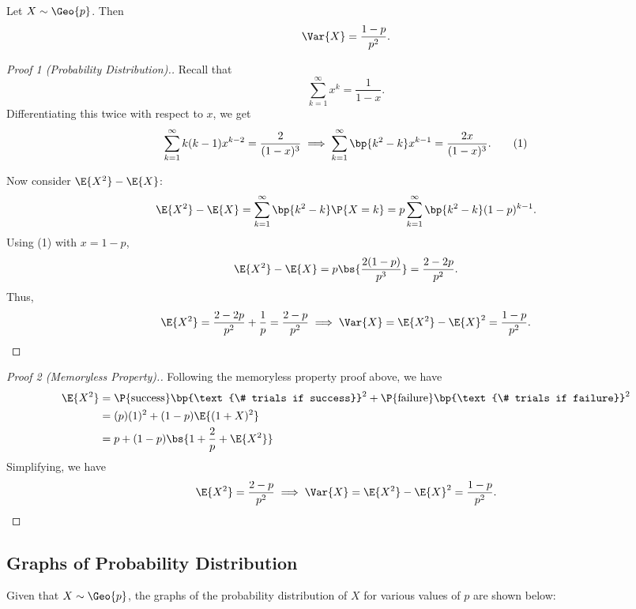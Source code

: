 \begin{proposition}
    Let $X \sim \Geo{p}$. Then \[\Var{X} = \frac{1-p}{p^2}.\]
\end{proposition}
\begin{proof}[Proof 1 (Probability Distribution).]
    Recall that \[\sum_{k = 1}^\infty x^k = \frac{1}{1 - x}.\] Differentiating this twice with respect to $x$, we get \[\sum_{k = 1}^\infty k(k-1) x^{k-2} = \frac{2}{(1-x)^3} \implies \sum_{k = 1}^\infty \bp{k^2 - k} x^{k-1} = \frac{2x}{(1-x)^3}. \tag{1}\]

    Now consider $\E{X^2} - \E{X}$: \[\E{X^2} - \E{X}= \sum_{k = 1}^\infty \bp{k^2 - k} \P{X = k} = p \sum_{k = 1}^\infty \bp{k^2 - k} (1-p)^{k-1}.\] Using (1) with $x = 1-p$, \[\E{X^2} - \E{X} = p \bs{\frac{2(1-p)}{p^3}} = \frac{2 - 2p}{p^2}.\] Thus, \[\E{X^2} = \frac{2 - 2p}{p^2} + \frac1p = \frac{2-p}{p^2} \implies \Var{X} = \E{X^2} - \E{X}^2 = \frac{1-p}{p^2}.\]
\end{proof}
\begin{proof}[Proof 2 (Memoryless Property).]
    Following the memoryless property proof above, we have 
    \begin{align*}
        \E{X^2} &= \P{\text{success}} \bp{\text{\# trials if success}}^2 + \P{\text{failure}} \bp{\text{\# trials if failure}}^2\\
        &= (p)(1)^2 + (1-p)\E{(1 + X)^2}\\
        &= p + (1-p)\bs{1 + \frac2p + \E{X^2}}
    \end{align*}
    Simplifying, we have \[\E{X^2} = \frac{2-p}{p^2} \implies \Var{X} = \E{X^2} - \E{X}^2 = \frac{1-p}{p^2}.\]
\end{proof}

\subsection{Graphs of Probability Distribution}

Given that $X \sim \Geo{p}$, the graphs of the probability distribution of $X$ for various values of $p$ are shown below:

